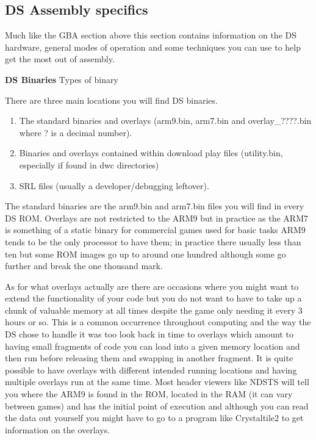 \documentclass[
]{book}
\providecommand{\tightlist}{%
  \setlength{\itemsep}{0pt}\setlength{\parskip}{0pt}}
\begin{document}
\hypertarget{ds-assembly-specifics}{%
\subsection{DS Assembly specifics}\label{ds-assembly-specifics}}

Much like the GBA section above this section contains information on the DS hardware, general modes of operation and some techniques you can use to help get the most out of assembly.

\textbf{DS Binaries} Types of binary

There are three main locations you will find DS binaries.

\begin{enumerate}
\def\labelenumi{\arabic{enumi}.}
\tightlist
\item
  The standard binaries and overlays (arm9.bin, arm7.bin and overlay\_????.bin where ? is a decimal number).
\item
  Binaries and overlays contained within download play files (utility.bin, especially if found in dwc directories)
\item
  SRL files (usually a developer/debugging leftover).
\end{enumerate}

The standard binaries are the arm9.bin and arm7.bin files you will find in every DS ROM. Overlays are not restricted to the ARM9 but in practice as the ARM7 is something of a static binary for commercial games used for basic tasks ARM9 tends to be the only processor to have them; in practice there usually less than ten but some ROM images go up to around one hundred although some go further and break the one thousand mark.

As for what overlays actually are there are occasions where you might want to extend the functionality of your code but you do not want to have to take up a chunk of valuable memory at all times despite the game only needing it every 3 hours or so. This is a common occurrence throughout computing and the way the DS chose to handle it was too look back in time to overlays which amount to having small fragments of code you can load into a given memory location and then run before releasing them and swapping in another fragment. It is quite possible to have overlays with different intended running locations and having multiple overlays run at the same time. Most header viewers like NDSTS will tell you where the ARM9 is found in the ROM, located in the RAM (it can vary between games) and has the initial point of execution and although you can read the data out yourself you might have to go to a program like Crystaltile2 to get information on the overlays.
\end{document}
